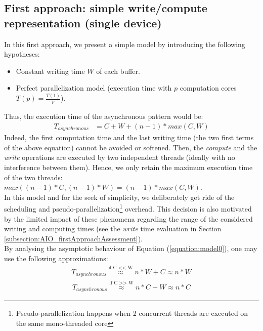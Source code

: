 	\subsection{First approach: simple write/compute representation (single \notationIO\space device)} \label{subsection:firstModel}
		In this first approach, we present a simple model by introducing the following hypotheses:
		\begin{itemize}
			\item Constant writing time $W$ of each buffer.
			\item Perfect parallelization model (execution time with $p$ computation cores $T(p) = \frac{T(1)}{p}$).
		\end{itemize}
		Thus, the execution time of the asynchronous pattern would be:
			\begin{equation}
			\begin{aligned}
				T_{asynchronous}&= C + W + (n-1) * max(C , W)
			\end{aligned}
			\label{equation:model0}
			\end{equation}
		Indeed, the first computation time and the last writing time (the two first terms of the above equation) cannot be avoided or softened.   Then, the \emph{compute} and the \emph{write} operations are executed by two independent threads (ideally with no interference between them).   Hence, we only retain the maximum execution time of the two threads: $max((n-1)*C, (n-1)*W) = (n-1) * max(C, W)$.\\

		In this model and for the seek of simplicity, we deliberately get ride of the scheduling and pseudo-parallelization\footnote{Pseudo-parallelization happens when 2 concurrent threads are executed on the same mono-threaded core} overhead.   This decision is also motivated by the limited impact of these phenomena regarding the range of the considered writing and computing times (see the \emph{write} time evaluation in Section \ref{subsection:AIO_firstApproachAssessment}).\\

		By analysing the asymptotic behaviour of Equation (\ref{equation:model0}), one may use the following approximations:
			\begin{equation}
			\begin{aligned}
				T_{asynchronous}	\stackrel{\text{if C << W}}{\approx} n * W + C
									\stackrel{}{\approx} n * W
			\end{aligned}
			\label{equation:model0:C<<W}
			\end{equation}
			\begin{equation}
			\begin{aligned}
				T_{asynchronous}	\stackrel{\text{if C >> W}}{\approx} n * C + W
									\stackrel{}{\approx} n * C
			\end{aligned}
			\label{equation:model0:C>>W}
			\end{equation}


